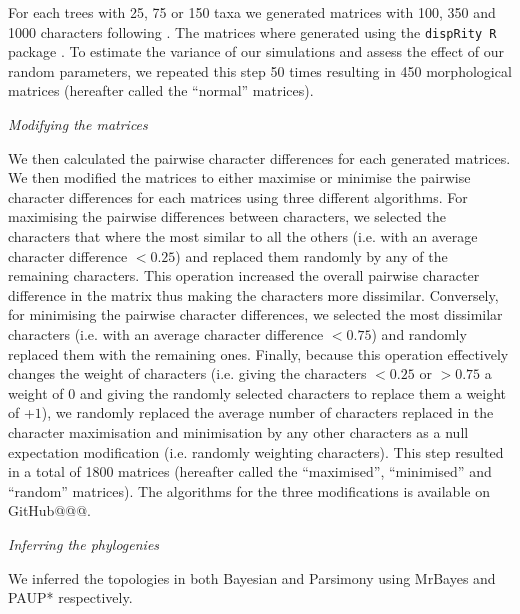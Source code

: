 \documentclass[12pt,letterpaper]{article}
\renewcommand{\subsection}[1]{%
\bigskip
\begin{center}
\begin{large}
\normalfont\itshape #1
\end{large}
\end{center}}
\begin{document}
For each trees with 25, 75 or 150 taxa we generated matrices with 100, 350 and 1000 characters following \cite{OReilly20160081}.
The matrices where generated using the \texttt{dispRity R} package \citep[][; \url{https://github.com/TGuillerme/dispRity}]{thomas_guillerme_2016_55646}.
To estimate the variance of our simulations and assess the effect of our random parameters, we repeated this step 50 times resulting in 450 morphological matrices (hereafter called the ``normal'' matrices).

\subsection{Modifying the matrices}

We then calculated the pairwise character differences for each generated matrices. 
We then modified the matrices to either maximise or minimise the pairwise character differences for each matrices using three different algorithms.
For maximising the pairwise differences between characters, we selected the characters that where the most similar to all the others (i.e. with an average character difference $<$$0.25$) and replaced them randomly by any of the remaining characters.
This operation increased the overall pairwise character difference in the matrix thus making the characters more dissimilar.
Conversely, for minimising the pairwise character differences, we selected the most dissimilar characters (i.e. with an average character difference $<$$0.75$) and randomly replaced them with the remaining ones.
Finally, because this operation effectively changes the weight of characters (i.e. giving the characters $<$$0.25$ or $>$$0.75$ a weight of $0$ and giving the randomly selected characters to replace them a weight of +$1$), we randomly replaced the average number of characters replaced in the character maximisation and minimisation by any other characters as a null expectation modification (i.e. randomly weighting characters).
This step resulted in a total of 1800 matrices (hereafter called the ``maximised'', ``minimised'' and ``random'' matrices).
The algorithms for the three modifications is available on GitHub@@@. %

\subsection{Inferring the phylogenies}

We inferred the topologies in both Bayesian and Parsimony using MrBayes and PAUP* respectively.
\end{document}
